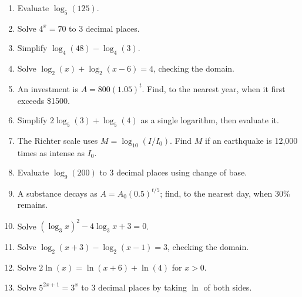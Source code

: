 \documentclass[11pt]{article}
\begin{document}
\clearpage
{}

\begin{recapbox}
\begin{multicols}{2}
\small
\begin{enumerate}[leftmargin=*,itemsep=3pt]
  \item Evaluate $\log_5(125)$.
  \item Solve $4^x=70$ to 3 decimal places.
  \item Simplify $\log_4(48)-\log_4(3)$.
  \item Solve $\log_2(x)+\log_2(x-6)=4$, checking the domain.
  \item An investment is $A=800(1.05)^t$. Find, to the nearest year, when it first exceeds \$1500.
  \item Simplify $2\log_5(3)+\log_5(4)$ as a single logarithm, then evaluate it.
  \item The Richter scale uses $M=\log_{10}(I/I_0)$. Find $M$ if an earthquake is 12{,}000 times as intense as $I_0$.
  \item Evaluate $\log_9(200)$ to 3 decimal places using change of base.
  \item A substance decays as $A=A_0(0.5)^{t/5}$; find, to the nearest day, when 30\% remains.
  \item Solve $(\log_3x)^2-4\log_3x+3=0$.
  \item Solve $\log_2(x+3)-\log_2(x-1)=3$, checking the domain.
  \item Solve $2\ln(x)=\ln(x+6)+\ln(4)$ for $x>0$.
  \item Solve $5^{2x+1}=3^{x}$ to 3 decimal places by taking $\ln$ of both sides.
\end{enumerate}
\end{multicols}
\end{recapbox}
\end{document}
